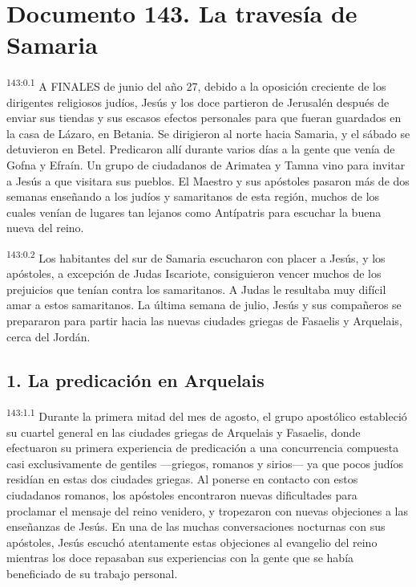 \chapter{Documento 143. La travesía de Samaria}
\par
\textsuperscript{143:0.1} A FINALES de junio del año 27, debido a la oposición creciente de los dirigentes religiosos judíos, Jesús y los doce partieron de Jerusalén después de enviar sus tiendas y sus escasos efectos personales para que fueran guardados en la casa de Lázaro, en Betania. Se dirigieron al norte hacia Samaria, y el sábado se detuvieron en Betel. Predicaron allí durante varios días a la gente que venía de Gofna y Efraín. Un grupo de ciudadanos de Arimatea y Tamna vino para invitar a Jesús a que visitara sus pueblos. El Maestro y sus apóstoles pasaron más de dos semanas enseñando a los judíos y samaritanos de esta región, muchos de los cuales venían de lugares tan lejanos como Antípatris para escuchar la buena nueva del reino.

\par
\textsuperscript{143:0.2} Los habitantes del sur de Samaria escucharon con placer a Jesús, y los apóstoles, a excepción de Judas Iscariote, consiguieron vencer muchos de los prejuicios que tenían contra los samaritanos. A Judas le resultaba muy difícil amar a estos samaritanos. La última semana de julio, Jesús y sus compañeros se prepararon para partir hacia las nuevas ciudades griegas de Fasaelis y Arquelais, cerca del Jordán.

\section*{1. La predicación en Arquelais}
\par
\textsuperscript{143:1.1} Durante la primera mitad del mes de agosto, el grupo apostólico estableció su cuartel general en las ciudades griegas de Arquelais y Fasaelis, donde efectuaron su primera experiencia de predicación a una concurrencia compuesta casi exclusivamente de gentiles ---griegos, romanos y sirios--- ya que pocos judíos residían en estas dos ciudades griegas. Al ponerse en contacto con estos ciudadanos romanos, los apóstoles encontraron nuevas dificultades para proclamar el mensaje del reino venidero, y tropezaron con nuevas objeciones a las enseñanzas de Jesús. En una de las muchas conversaciones nocturnas con sus apóstoles, Jesús escuchó atentamente estas objeciones al evangelio del reino mientras los doce repasaban sus experiencias con la gente que se había beneficiado de su trabajo personal.

